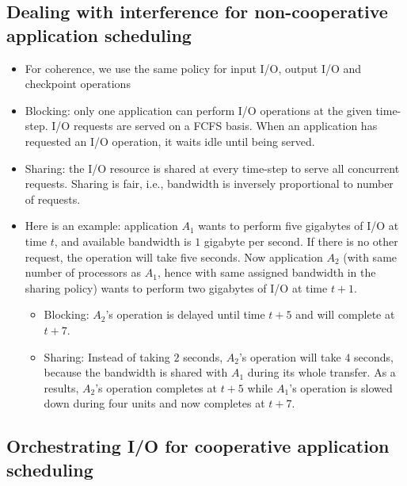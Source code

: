 \subsection{Dealing with interference for non-cooperative application scheduling}
\begin{itemize}
  \item For coherence, we use the same policy for input I/O, output I/O and checkpoint operations 
  \item Blocking: only one application can perform I/O operations at the given time-step.
  I/O requests are served on a FCFS basis. When an application has requested an I/O
  operation, it waits idle until being served. 
  \item Sharing: the I/O resource is shared at every time-step to serve all concurrent requests. Sharing is fair, i.e., bandwidth is inversely proportional to number of requests.
  \item Here is an example:
  application $A_{1}$ wants to perform five gigabytes of I/O at time $t$,
  and available bandwidth is
  $1$ gigabyte per second. If there is no other request, the operation will take five seconds.
  Now application $A_{2}$ (with same number of processors as $A_{1}$, hence with same assigned bandwidth in the sharing policy) wants to perform two gigabytes of I/O at time $t+1$.
  \begin{itemize}
  \item Blocking: $A_{2}$'s operation is delayed until time $t+5$ and will complete at $t+7$.
  \item Sharing: Instead of taking $2$ seconds, $A_{2}$'s operation will take $4$ seconds, because the bandwidth is shared with $A_{1}$ during its whole transfer. As a results, $A_{2}$'s operation completes at $t+5$ while $A_{1}$'s  operation is slowed down during four units and now completes at $t+7$.
  \end{itemize}
\end{itemize}

\subsection{Orchestrating I/O for cooperative application scheduling}

